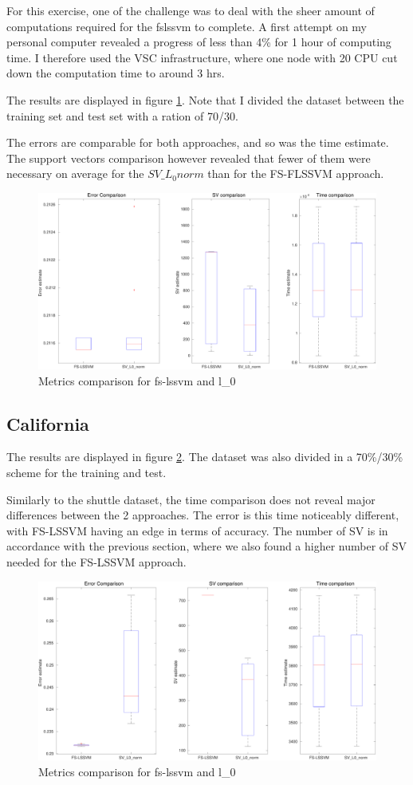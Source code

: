 \documentclass[11pt, a4paper]{article}
\begin{document}
For this exercise, one of the challenge was to deal with the sheer
amount of computations required for the fslssvm to complete. A first
attempt on my personal computer revealed a progress of less than 4\%
for 1 hour of computing time. I therefore used the VSC infrastructure,
where one node with 20 CPU cut down the computation time to around 3
hrs.

The results are displayed in figure \ref{fig:fslssvm_shuttle}. Note
that I divided the dataset between the training set and test set with
a ration of 70/30.

The errors are comparable for both approaches, and so was the time
estimate. The support vectors comparison however revealed that fewer
of them were necessary on average for the $SV\_L_0 norm$ than for the
FS-FLSSVM approach.

\begin{figure}[H]
  \centering
  \includegraphics[scale=.40]{fslssvm_shuttle.pdf}
  \caption{Metrics comparison for fs-lssvm and l\_0}
  \label{fig:fslssvm_shuttle}
\end{figure}

\subsection{California}

The results are displayed in figure \ref{fig:fslssvm_california}. The
dataset was also divided in a 70\%/30\% scheme for the training and
test.

Similarly to the shuttle dataset, the time comparison does not reveal
major differences between the 2 approaches. The error is this time
noticeably different, with FS-LSSVM having an edge in terms of
accuracy. The number of SV is in accordance with the previous section,
where we also found a higher number of SV needed for the FS-LSSVM
approach.

\begin{figure}[H]
  \centering
  \includegraphics[scale=.40]{fslssvm_california.pdf}
  \caption{Metrics comparison for fs-lssvm and l\_0}
  \label{fig:fslssvm_california}
\end{figure}
% 
\end{document}
